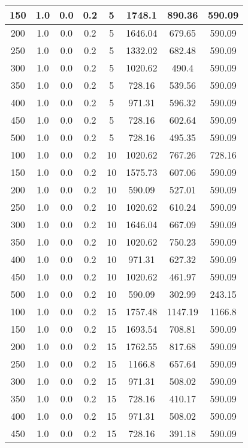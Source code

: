 \documentclass[a4paper, 12pt]{extreport}
\begin{document}
\begin{itemize}
\begin{longtable}{|c|c|c|c|c|c|c|c|}
			150 & 1.0 & 0.0 & 0.2 & 5 & 1748.1 & 890.36 & 590.09 \\\hline
			200 & 1.0 & 0.0 & 0.2 & 5 & 1646.04 & 679.65 & 590.09 \\\hline
			250 & 1.0 & 0.0 & 0.2 & 5 & 1332.02 & 682.48 & 590.09 \\\hline
			300 & 1.0 & 0.0 & 0.2 & 5 & 1020.62 & 490.4 & 590.09 \\\hline
			350 & 1.0 & 0.0 & 0.2 & 5 & 728.16 & 539.56 & 590.09 \\\hline
			400 & 1.0 & 0.0 & 0.2 & 5 & 971.31 & 596.32 & 590.09 \\\hline
			450 & 1.0 & 0.0 & 0.2 & 5 & 728.16 & 602.64 & 590.09 \\\hline
			500 & 1.0 & 0.0 & 0.2 & 5 & 728.16 & 495.35 & 590.09 \\\hline
			100 & 1.0 & 0.0 & 0.2 & 10 & 1020.62 & 767.26 & 728.16 \\\hline
			150 & 1.0 & 0.0 & 0.2 & 10 & 1575.73 & 607.06 & 590.09 \\\hline
			200 & 1.0 & 0.0 & 0.2 & 10 & 590.09 & 527.01 & 590.09 \\\hline
			250 & 1.0 & 0.0 & 0.2 & 10 & 1020.62 & 610.24 & 590.09 \\\hline
			300 & 1.0 & 0.0 & 0.2 & 10 & 1646.04 & 667.09 & 590.09 \\\hline
			350 & 1.0 & 0.0 & 0.2 & 10 & 1020.62 & 750.23 & 590.09 \\\hline
			400 & 1.0 & 0.0 & 0.2 & 10 & 971.31 & 627.32 & 590.09 \\\hline
			450 & 1.0 & 0.0 & 0.2 & 10 & 1020.62 & 461.97 & 590.09 \\\hline
			500 & 1.0 & 0.0 & 0.2 & 10 & 590.09 & 302.99 & 243.15 \\\hline
			100 & 1.0 & 0.0 & 0.2 & 15 & 1757.48 & 1147.19 & 1166.8 \\\hline
			150 & 1.0 & 0.0 & 0.2 & 15 & 1693.54 & 708.81 & 590.09 \\\hline
			200 & 1.0 & 0.0 & 0.2 & 15 & 1762.55 & 817.68 & 590.09 \\\hline
			250 & 1.0 & 0.0 & 0.2 & 15 & 1166.8 & 657.64 & 590.09 \\\hline
			300 & 1.0 & 0.0 & 0.2 & 15 & 971.31 & 508.02 & 590.09 \\\hline
			350 & 1.0 & 0.0 & 0.2 & 15 & 728.16 & 410.17 & 590.09 \\\hline
			400 & 1.0 & 0.0 & 0.2 & 15 & 971.31 & 508.02 & 590.09 \\\hline
			450 & 1.0 & 0.0 & 0.2 & 15 & 728.16 & 391.18 & 590.09 \\\hline

\end{longtable}
\end{itemize}
\end{document}
